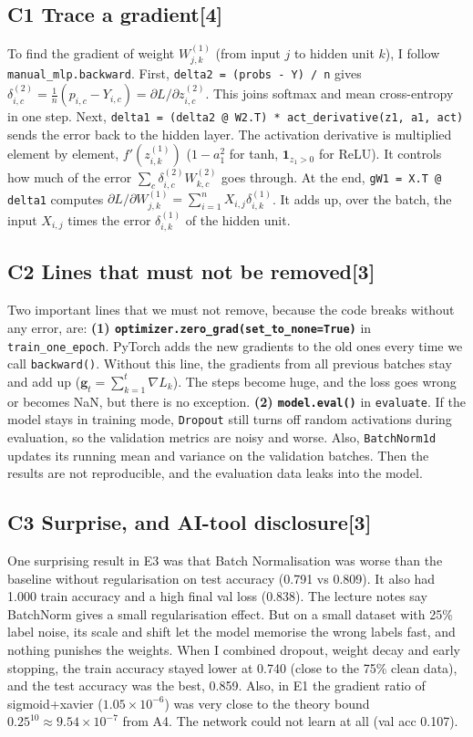 \documentclass[conference,a4paper]{IEEEtran}
\newcommand{\task}[2]{\subsection{#1\hfill[#2]}}
\begin{document}
\task{C1 Trace a gradient}{4}
To find the gradient of weight $W^{(1)}_{j,k}$ (from input $j$ to hidden unit $k$), I follow \texttt{manual\_mlp.backward}. First, \texttt{delta2 = (probs - Y) / n} gives $\delta^{(2)}_{i,c} = \frac{1}{n}(p_{i,c} - Y_{i,c}) = \partial L / \partial z^{(2)}_{i,c}$. This joins softmax and mean cross-entropy in one step.
Next, \texttt{delta1 = (delta2 @ W2.T) * act\_derivative(z1, a1, act)} sends the error back to the hidden layer. The activation derivative is multiplied element by element, $f'(z^{(1)}_{i,k})$ ($1 - a_1^2$ for tanh, $\mathbf{1}_{z_1>0}$ for ReLU). It controls how much of the error $\sum_c \delta^{(2)}_{i,c} W^{(2)}_{k,c}$ goes through.
At the end, \texttt{gW1 = X.T @ delta1} computes $\partial L / \partial W^{(1)}_{j,k} = \sum_{i=1}^n X_{i,j} \delta^{(1)}_{i,k}$. It adds up, over the batch, the input $X_{i,j}$ times the error $\delta^{(1)}_{i,k}$ of the hidden unit.

\task{C2 Lines that must not be removed}{3}
Two important lines that we must not remove, because the code breaks without any error, are:
\textbf{(1) \texttt{optimizer.zero\_grad(set\_to\_none=True)}} in \texttt{train\_one\_epoch}. PyTorch adds the new gradients to the old ones every time we call \texttt{backward()}. Without this line, the gradients from all previous batches stay and add up ($\mathbf{g}_t = \sum_{k=1}^t \nabla L_k$). The steps become huge, and the loss goes wrong or becomes NaN, but there is no exception.
\textbf{(2) \texttt{model.eval()}} in \texttt{evaluate}. If the model stays in training mode, \texttt{Dropout} still turns off random activations during evaluation, so the validation metrics are noisy and worse. Also, \texttt{BatchNorm1d} updates its running mean and variance on the validation batches. Then the results are not reproducible, and the evaluation data leaks into the model.

\task{C3 Surprise, and AI-tool disclosure}{3}
One surprising result in E3 was that Batch Normalisation was worse than the baseline without regularisation on test accuracy (0.791 vs 0.809). It also had 1.000 train accuracy and a high final val loss (0.838). The lecture notes say BatchNorm gives a small regularisation effect. But on a small dataset with 25\% label noise, its scale and shift let the model memorise the wrong labels fast, and nothing punishes the weights. When I combined dropout, weight decay and early stopping, the train accuracy stayed lower at 0.740 (close to the 75\% clean data), and the test accuracy was the best, 0.859.
Also, in E1 the gradient ratio of sigmoid+xavier ($1.05\times 10^{-6}$) was very close to the theory bound $0.25^{10}\approx 9.54\times 10^{-7}$ from A4. The network could not learn at all (val acc 0.107).
\end{document}
